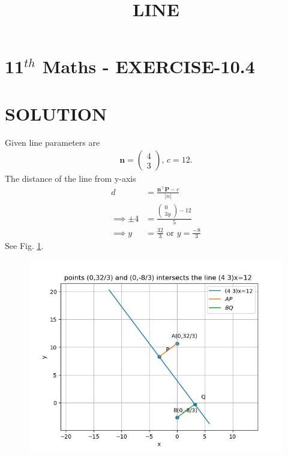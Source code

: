 \documentclass[12pt]{article}
\newcommand{\myvec}[1]{\ensuremath{\begin{pmatrix}#1\end{pmatrix}}}
\providecommand{\abs}[1]{\left\vert#1\right\vert}
\let\vec\mathbf
\begin{document}
\begin{center}
\title{\textbf{LINE}}
\date{\vspace{-5ex}} %
\maketitle
\end{center}

\section{11$^{th}$ Maths - EXERCISE-10.4}
\begin{enumerate}
\end{enumerate}
\section{SOLUTION}
\fi
Given line parameters are
\begin{align}
\vec{n}=\myvec{4\\3},\,
c=12.
\end{align}
The distance of the line from y-axis
\begin{align}
d&=\frac{\vec{n}^\top\vec{P}-c}{\abs{n}}\\
\implies\pm4&=\frac{\myvec{0\\ 3y}-12}{5}\\
	\implies y&= \frac{32}{3}\text{ or }y=\frac{-8}{3}
\end{align}
See Fig. 
		\ref{fig:chapters/11/10/4/4/Figure}.
\begin{figure}[h]
\centering
\includegraphics[width=\columnwidth]{chapters/11/10/4/4/figs/fig.png}
\caption{}
		\label{fig:chapters/11/10/4/4/Figure}
\end{figure}
\end{document}
